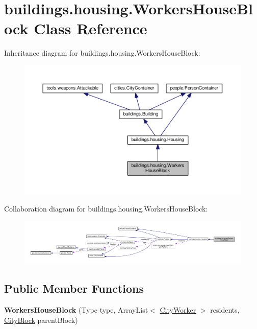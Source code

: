 \hypertarget{classbuildings_1_1housing_1_1_workers_house_block}{}\section{buildings.\+housing.\+Workers\+House\+Block Class Reference}
\label{classbuildings_1_1housing_1_1_workers_house_block}


Inheritance diagram for buildings.\+housing.\+Workers\+House\+Block\+:\nopagebreak
\begin{figure}[H]
\begin{center}
\leavevmode
\includegraphics[width=350pt]{classbuildings_1_1housing_1_1_workers_house_block__inherit__graph}
\end{center}
\end{figure}


Collaboration diagram for buildings.\+housing.\+Workers\+House\+Block\+:\nopagebreak
\begin{figure}[H]
\begin{center}
\leavevmode
\includegraphics[width=350pt]{classbuildings_1_1housing_1_1_workers_house_block__coll__graph}
\end{center}
\end{figure}
\subsection*{Public Member Functions}
\begin{DoxyCompactItemize}
\item 
{\bfseries Workers\+House\+Block} (Type type, Array\+List$<$ \hyperlink{classpeople_1_1cityworkers_1_1_city_worker}{City\+Worker} $>$ residents, \hyperlink{classcities_1_1_city_block}{City\+Block} parent\+Block)\hypertarget{classbuildings_1_1housing_1_1_workers_house_block_a962f1353985f42af0a9757d97ef7395a}{}\label{classbuildings_1_1housing_1_1_workers_house_block_a962f1353985f42af0a9757d97ef7395a}

\end{DoxyCompactItemize}
